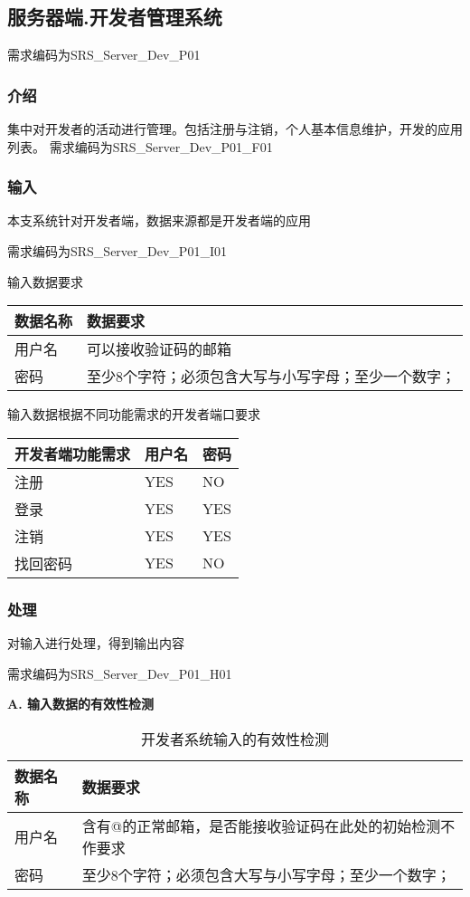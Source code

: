 \subsection{服务器端.开发者管理系统}
需求编码为SRS\_Server\_Dev\_P01
\subsubsection{介绍}
集中对开发者的活动进行管理。包括注册与注销，个人基本信息维护，开发的应用列表。
需求编码为SRS\_Server\_Dev\_P01\_F01
\subsubsection{输入}

本支系统针对开发者端，数据来源都是开发者端的应用

需求编码为SRS\_Server\_Dev\_P01\_I01

输入数据要求

\begin{longtable}[]{@{}ll@{}}
\toprule
数据名称 & 数据要求\tabularnewline
\midrule
\endhead
用户名 & 可以接收验证码的邮箱\tabularnewline
密码 &
至少8个字符；必须包含大写与小写字母；至少一个数字；\tabularnewline
\bottomrule
\end{longtable}

输入数据根据不同功能需求的开发者端口要求

\begin{longtable}[]{@{}lll@{}}
\toprule
开发者端功能需求 & 用户名 & 密码\tabularnewline
\midrule
\endhead
注册 & YES & NO\tabularnewline
登录 & YES & YES\tabularnewline
注销 & YES & YES\tabularnewline
找回密码 & YES & NO\tabularnewline
\bottomrule
\end{longtable}

\subsubsection{处理}

对输入进行处理，得到输出内容

需求编码为SRS\_Server\_Dev\_P01\_H01

\textbf{A. 输入数据的有效性检测}

\begin{longtable}[]{@{}ll@{}}
\caption{开发者系统输入的有效性检测}\label{tab:developer_sys_input_valid}\\
\toprule
数据名称 & 数据要求\tabularnewline
\midrule
\endhead
用户名 & 含有@的正常邮箱，是否能接收验证码在此处的初始检测不作要求\tabularnewline
密码 &
至少8个字符；必须包含大写与小写字母；至少一个数字；\tabularnewline
\bottomrule
\end{longtable}

